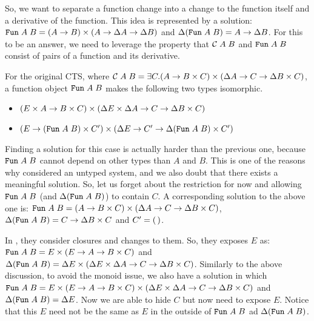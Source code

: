 \documentclass{article}
\theoremstyle{definition}
\begin{document}
So, we want to separate a function change into a change to the function itself and a derivative of the function. This idea is represented by a solution: 
$\texttt{Fun} \; A \; B = (A \to B) \times (A \to \Delta A \to \Delta B)$ and $\Delta (\texttt{Fun} \; A \; B) = A \to \Delta B$.
For this to be an answer, we need to leverage the property that $\mathcal{C} \; A \; B$ and $\texttt{Fun} \; A \; B$ consist of pairs of 
a function and its derivative. 


For the original CTS, where $\mathcal{C} \; A \; B = \exists C. (A \to B \times C) \times (\Delta A \to C \to \Delta B \times C)$, 
a function object $\texttt{Fun} \; A \; B$ makes the following two types isomorphic. 
\begin{itemize}
 \item 
   \( (E \times A \to B \times C ) \times ( \Delta E \times \Delta A \to C \to \Delta B \times C) \)
 \item 
   \( 
      (E \to (\texttt{Fun} \; A \; B) \times C') \times (\Delta E \to C' \to \Delta (\texttt{Fun} \; A \; B) \times C')
   \) 
\end{itemize}
Finding a solution for this case is actually harder than the previous one, because 
$\texttt{Fun} \; A \; B$ cannot depend on other types than $A$ and $B$. 
This is one of the reasons why \citet{GiarrussoRS19} considered an untyped system, 
and we also doubt that there exists a meaningful solution. So, let us forget about the 
restriction for now and allowing $\texttt{Fun} \; A \; B$ (and $\Delta (\texttt{Fun} \; A \; B)$) to contain $C$.
A corresponding solution to the above one is: 
$\texttt{Fun} \; A \; B = (A \to B \times C) \times (\Delta A \to C \to \Delta B \times C)$, 
$\Delta (\texttt{Fun} \; A \; B) = C \to \Delta B \times C$ and $C' = (\,)$. 

In \citet{GiarrussoRS19}, they consider closures and changes to them. So, they exposes $E$ as: $\texttt{Fun} \; A \; B = E \times (E \to A \to B \times C)$ and 
$\Delta (\texttt{Fun} \; A \; B) = \Delta E \times (\Delta E \times \Delta A \to C \to \Delta B \times C)$.
Similarly to the above discussion, to avoid the monoid issue, we also 
have a solution in which $\texttt{Fun} \; A \; B =  E \times (E \to A \to B \times C) \times  (\Delta E \times \Delta A \to C \to \Delta B \times C)$ and $\Delta (\texttt{Fun} \; A \; B) = \Delta E$.
Now we are able to hide $C$ but now need to expose $E$. Notice that this $E$ need not be the same as $E$ in the outside of $\texttt{Fun} \; A \; B$ ad $\Delta (\texttt{Fun} \; A \; B)$.
\end{document}
